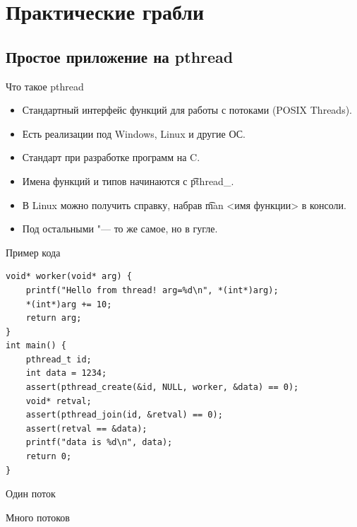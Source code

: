 \section{Практические грабли}
\subsection{Простое приложение на pthread}

\begin{frame}
\end{frame}

\begin{frame}{Что такое pthread}
	\begin{itemize}
		\item Стандартный интерфейс функций для работы с потоками (POSIX Threads).
		\item Есть реализации под Windows, Linux и другие ОС.
		\item Стандарт при разработке программ на C.
		\item Имена функций и типов начинаются с \t{pthread\_}.
		\item В Linux можно получить справку, набрав \t{man <имя функции>} в консоли.
		\item Под остальными "--- то же самое, но в гугле.
	\end{itemize}
\end{frame}

\begin{frame}[fragile]{Пример кода}
\begin{verbatim}
void* worker(void* arg) {
    printf("Hello from thread! arg=%d\n", *(int*)arg);
    *(int*)arg += 10;
    return arg;
}
int main() {
    pthread_t id;
    int data = 1234;
    assert(pthread_create(&id, NULL, worker, &data) == 0);
    void* retval;
    assert(pthread_join(id, &retval) == 0);
    assert(retval == &data);
    printf("data is %d\n", data);
    return 0;
}
\end{verbatim}
\end{frame}

\begin{frame}[fragile]{Один поток}
\end{frame}

\begin{frame}[fragile]{Много потоков}
\end{frame}

